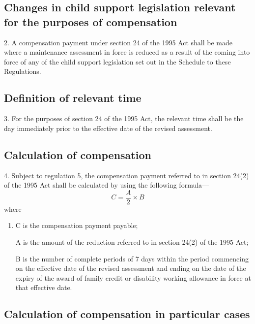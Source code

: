 \documentclass[12pt,a4paper]{article}
\begin{document}
\subsection[2. Changes in child support legislation relevant for the purposes of compensation]{Changes in child support legislation relevant for the purposes of compensation}

2.  A compensation payment under section 24 of the 1995 Act shall be made where a maintenance assessment in force is reduced as a result of the coming into force of any of the child support legislation set out in the Schedule to these Regulations.

\subsection[3. Definition of relevant time]{Definition of relevant time}

3.  For the purposes of section 24 of the 1995 Act, the relevant time shall be the day immediately prior to the effective date of the revised assessment.

\subsection[4. Calculation of compensation]{Calculation of compensation}

4.  Subject to regulation 5, the compensation payment referred to in section 24(2) of the 1995 Act shall be calculated by using the following formula—
\[C = \frac{A}{2} \times B\]
where—
\begin{enumerate}\item[]
C is the compensation payment payable;

A is the amount of the reduction referred to in section 24(2) of the 1995 Act;

B is the number of complete periods of 7 days within the period commencing on the effective date of the revised assessment and ending on the date of the expiry of the award of family credit or disability working allowance in force at that effective date.
\end{enumerate}

\subsection[5. Calculation of compensation in particular cases]{Calculation of compensation in particular cases}
\end{document}
